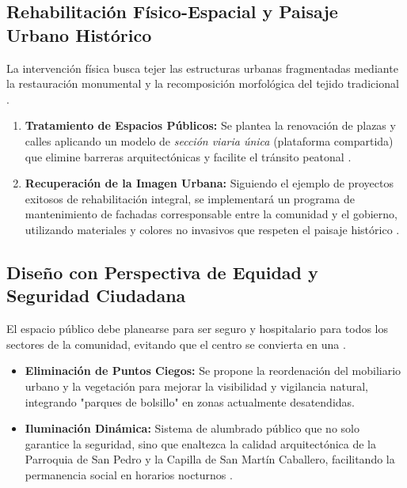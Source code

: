 \subsection{Rehabilitación Físico-Espacial y Paisaje Urbano Histórico}
\label{ssec:rehabilitacion-paisaje}

La intervención física busca tejer las estructuras urbanas fragmentadas mediante la 
restauración monumental y la recomposición morfológica del tejido 
tradicional \cite{balandrano2016conservacion}.

\begin{enumerate}
    \item \textbf{Tratamiento de Espacios Públicos:} Se plantea la renovación 
            de plazas y calles aplicando un modelo de \textit{sección viaria única} 
            (plataforma compartida) que elimine barreras arquitectónicas y facilite 
            el tránsito peatonal \cite{balandrano2016conservacion}.
    \item \textbf{Recuperación de la Imagen Urbana:} Siguiendo el ejemplo de proyectos 
    exitosos de rehabilitación integral, se implementará un programa de mantenimiento 
    de fachadas corresponsable entre la comunidad y el gobierno, utilizando materiales 
    y colores no invasivos que respeten el paisaje 
    histórico \cite{balandrano2016conservacion, ramirez2017gestion}.
\end{enumerate}

\subsection{Diseño con Perspectiva de Equidad y Seguridad Ciudadana}
\label{ssec:diseño-seguridad}

El espacio público debe planearse para ser seguro y hospitalario para todos los
sectores de la comunidad, evitando que el centro se convierta en una
 \cite{rodriguez2009tesis}.

\begin{itemize}
    \item \textbf{Eliminación de Puntos Ciegos:} Se propone la reordenación del 
            mobiliario urbano y la vegetación para mejorar la visibilidad y 
            vigilancia natural, integrando "parques de bolsillo" en zonas 
            actualmente desatendidas.
    \item \textbf{Iluminación Dinámica:} Sistema de alumbrado público que
            no solo garantice la seguridad, sino que enaltezca la calidad
            arquitectónica de la Parroquia de San Pedro y la Capilla de
            San Martín Caballero, facilitando la permanencia social en
            horarios nocturnos \cite{balandrano2016conservacion}.
\end{itemize}

